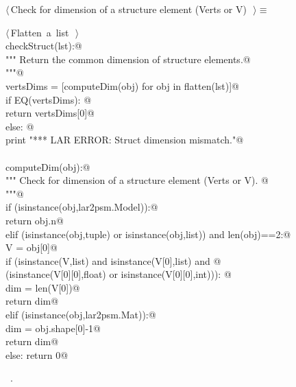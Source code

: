 \documentclass[11pt,oneside]{article}	%
\begin{document}
\begin{flushleft} \small \label{scrap34}
$\langle\,$Check for dimension of a structure element (Verts or V)\nobreak\ {\footnotesize {}}$\,\rangle\equiv$
\vspace{-1ex}
\begin{list}{}{} \item
\mbox{}\verb@@\hbox{$\langle\,$Flatten a list\nobreak\ {\footnotesize {}}$\,\rangle$}\verb@@\\
\mbox{}\verb@def checkStruct(lst):@\\
\mbox{}\verb@   """ Return the common dimension of structure elements.@\\
\mbox{}\verb@   """@\\
\mbox{}\verb@   vertsDims = [computeDim(obj) for obj in flatten(lst)]@\\
\mbox{}\verb@   if EQ(vertsDims): @\\
\mbox{}\verb@      return vertsDims[0]@\\
\mbox{}\verb@   else: @\\
\mbox{}\verb@      print "*** LAR ERROR: Struct dimension mismatch."@\\
\mbox{}\verb@@\\
\mbox{}\verb@def computeDim(obj):@\\
\mbox{}\verb@   """ Check for dimension of a structure element (Verts or V). @\\
\mbox{}\verb@   """@\\
\mbox{}\verb@   if (isinstance(obj,lar2psm.Model)):@\\
\mbox{}\verb@      return obj.n@\\
\mbox{}\verb@   elif (isinstance(obj,tuple) or isinstance(obj,list)) and len(obj)==2:@\\
\mbox{}\verb@      V = obj[0]@\\
\mbox{}\verb@      if (isinstance(V,list) and isinstance(V[0],list) and @\\
\mbox{}\verb@            (isinstance(V[0][0],float) or isinstance(V[0][0],int))): @\\
\mbox{}\verb@         dim = len(V[0])@\\
\mbox{}\verb@         return dim@\\
\mbox{}\verb@   elif (isinstance(obj,lar2psm.Mat)):@\\
\mbox{}\verb@      dim = obj.shape[0]-1@\\
\mbox{}\verb@      return dim@\\
\mbox{}\verb@   else: return 0@\\
\mbox{}\verb@@{\NWsep}
\end{list}
\vspace{-1ex}
\footnotesize\addtolength{\baselineskip}{-1ex}
\begin{list}{}{\setlength{\itemsep}{-\parsep}\setlength{\itemindent}{-\leftmargin}}
\item \NWtxtMacroRefIn\ .
\end{list}
\end{flushleft}
\end{document}
